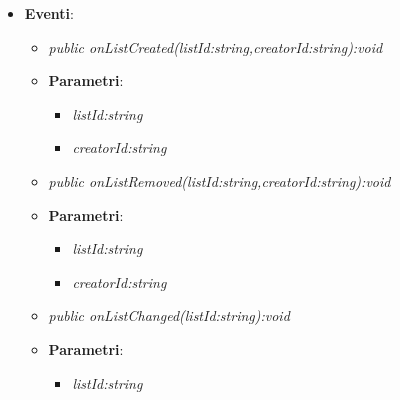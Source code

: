 \begin{itemize}
\begin{itemize}
{\begin{itemize}
			\end{itemize}}
	\end{itemize}
\item \textbf{Eventi}:
	\begin{itemize}
	\item \textit{public onListCreated(listId:string,creatorId:string):void}\\

			\item{\textbf{Parametri}: \begin{itemize}
			\item \textit{listId:string}\\

			\item \textit{creatorId:string}\\

			\end{itemize}}
	\item \textit{public onListRemoved(listId:string,creatorId:string):void}\\

			\item{\textbf{Parametri}: \begin{itemize}
			\item \textit{listId:string}\\

			\item \textit{creatorId:string}\\

			\end{itemize}}
	\item \textit{public onListChanged(listId:string):void}\\

			\item{\textbf{Parametri}: \begin{itemize}
			\item \textit{listId:string}\\

			\end{itemize}}
	\end{itemize}
\end{itemize}

